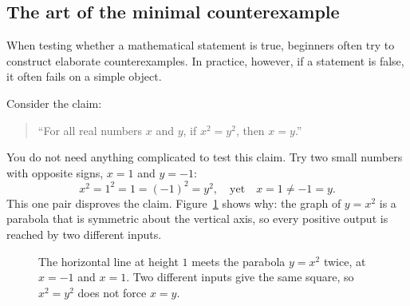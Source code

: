 \subsection{The art of the minimal counterexample}

When testing whether a mathematical statement is true, beginners often try to construct elaborate counterexamples. In practice, however, if a statement is false, it often fails on a simple object.

Consider the claim:
\begin{quote}
``For all real numbers $x$ and $y$, if $x^2 = y^2$, then $x = y$.''
\end{quote}
You do not need anything complicated to test this claim. Try two small numbers with opposite signs, $x = 1$ and $y = -1$:
\[
x^2 = 1^2 = 1 = (-1)^2 = y^2, \quad \text{yet} \quad x = 1 \neq -1 = y.
\]
This one pair disproves the claim. Figure~\ref{09:fig-square-pairs} shows why: the graph of $y = x^2$ is a parabola that is symmetric about the vertical axis, so every positive output is reached by two different inputs.

\begin{figure}[htbp]
\centering
{}
\caption{The horizontal line at height $1$ meets the parabola $y = x^2$ twice, at $x = -1$ and $x = 1$. Two different inputs give the same square, so $x^2 = y^2$ does not force $x = y$.}
\label{09:fig-square-pairs}
\end{figure}

